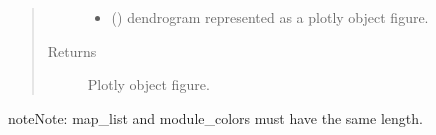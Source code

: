 \documentclass[letterpaper,10pt,english]{sphinxmanual}
\begin{document}
\begin{fulllineitems}
\begin{quote}
\begin{description}
\begin{itemize}
\item {} 
 () \textendash{} dendrogram represented as a plotly object figure.

\end{itemize}

\item[{Returns}] \leavevmode
Plotly object figure.

\end{description}\end{quote}

\begin{sphinxadmonition}{note}{Note:}
map\_list and module\_colors must have the same length.
\end{sphinxadmonition}

\end{fulllineitems}

\end{document}
